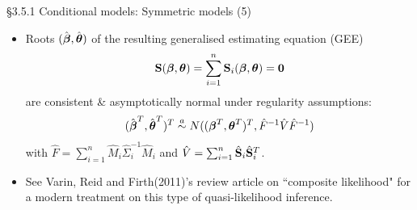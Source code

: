 \documentclass{beamer}
\newenvironment{wideitemize}%
  {\begin{itemize}%
    \setlength{\parskip}{1em}}%
  {\end{itemize}}
\begin{document}
\begin{frame}{\S3.5.1 Conditional models: Symmetric models (5)}
\begin{wideitemize}

\item
Roots $(\hat{\mbox{\boldmath $\beta$}}, \hat{\mbox{\boldmath $\theta$}})$ of the resulting
generalised estimating equation (GEE)
$$\textbf{S}(\mbox{\boldmath $\beta$}, \mbox{\boldmath $\theta$})=\sum_{i=1}^n
\textbf{S}_i(\mbox{\boldmath $\beta$}, \mbox{\boldmath $\theta$})=\textbf{0}$$
are consistent \& asymptotically normal under regularity assumptions:
$$(\hat{\mbox{\boldmath $\beta$}}^T, \hat{\mbox{\boldmath $\theta$}}^T)^T\stackrel{a}{\sim}
N((\mbox{\boldmath $\beta$}^T, \mbox{\boldmath $\theta$}^T)^T, \hat{F}^{-1}\hat{V}\hat{F}^{-1})$$
with $\hat{F}=\sum_{i=1}^n \hat{M}_i\hat{\Sigma}_i^{-1}\hat{M}_i$ and 
$\hat{V}=\sum_{i=1}^n\hat{\bf S}_i\hat{\bf S}_i^T$.

\item See Varin, Reid and Firth(2011)'s review article on ``composite likelihood" for a modern treatment on this type of quasi-likelihood inference.
\end{wideitemize}

\end{frame}
%
%
\end{document}
